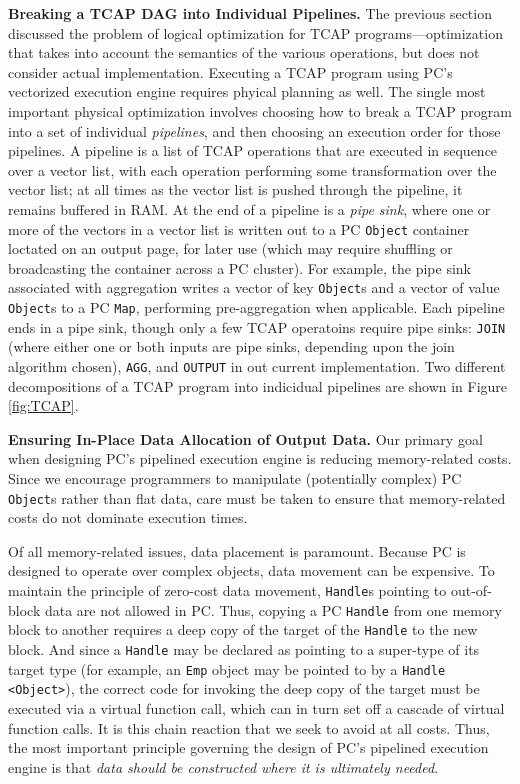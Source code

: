 \vspace{5 pt}
\noindent
\textbf{Breaking a TCAP DAG into Individual Pipelines.}
The previous section discussed the problem of logical optimization for TCAP programs---optimization that takes into account the semantics
of the various operations, but does not consider actual implementation.  
Executing a TCAP program using PC's vectorized execution engine requires phyical planning as well.  The single most important physical 
optimization involves choosing how to break a TCAP program into a set of individual \emph{pipelines}, and then choosing an execution order
for those pipelines.
A pipeline is a list of TCAP operations that are executed in sequence over a vector list, with each operation performing some
transformation over the vector list; at all times as the vector list is pushed through the pipeline, it remains buffered in RAM.  
At the end of a pipeline is a \emph{pipe sink}, where one or more of the
vectors in a vector list is written out to a PC \texttt{Object}
container loctated on an output page, for later use (which may require shuffling or broadcasting the container across a PC cluster).  
For example, the pipe sink associated with aggregation
writes a vector of key \texttt{Object}s and a vector of value \texttt{Object}s to a PC \texttt{Map}, performing pre-aggregation when
applicable.
Each pipeline ends in a pipe sink, though only a few TCAP operatoins require pipe sinks: \texttt{JOIN} (where either one or both inputs are pipe
sinks, depending upon the join algorithm chosen), \texttt{AGG}, and \texttt{OUTPUT} in out current implementation. 
Two different decompositions of a TCAP program into indicidual pipelines are shown in Figure \ref{fig:TCAP}.



\vspace{5 pt}
\noindent
\textbf{Ensuring In-Place Data Allocation of Output Data.}
Our primary goal when designing PC's pipelined execution engine is reducing  
memory-related costs.  
Since we 
encourage programmers to manipulate (potentially complex) PC \texttt{Object}s
rather than flat data, care must be taken to ensure that memory-related costs do
not dominate execution times.

Of all memory-related issues,  
data placement is paramount.  Because PC is designed to operate over
complex objects, data movement can be 
expensive.  To maintain the principle of
zero-cost data movement, \texttt{Handle}s pointing to out-of-block data are not allowed in PC.
Thus, copying a PC \texttt{Handle} from one memory block to another requires a deep copy of the target of the \texttt{Handle} to the new block.  
And since a
\texttt{Handle} may be declared as pointing to a super-type of its
target type (for example, an \texttt{Emp} object may be pointed to by a \texttt{Handle <Object>}), the correct code for invoking the deep copy of the
target must be executed via a virtual 
function call, which can in turn set off a cascade of virtual function calls. It is this chain reaction that we seek to avoid at all costs.
Thus, the most important principle governing the 
design of PC's pipelined execution engine is that \emph{data should be constructed where it is ultimately needed}.

